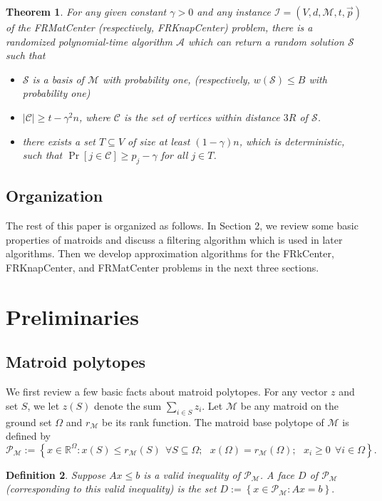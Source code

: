 \documentclass[a4paper,11pt]{article}
\newtheorem{theorem}{Theorem}[section]
\newtheorem{definition}[theorem]{Definition}
\newcommand{\A}{\mathcal{A}}
\newcommand{\C}{\mathcal{C}}
\renewcommand{\S}{\mathcal{S}}
\newcommand{\I}{\mathcal{I}}
\newcommand{\M}{\mathcal{M}}
\renewcommand{\P}{\mathcal{P}}
\begin{document}
\begin{theorem}
For any given constant $\gamma > 0$ and any instance $\I = (V, d, \M, t, \vec{p})$ of the \textsf{FRMatCenter} (respectively, \textsf{FRKnapCenter}) problem, there is a randomized polynomial-time algorithm $\A$ which can return a random solution $\S$ such that 
\begin{itemize}
	\item $\S$ is a basis of $\M$ with probability one, (respectively, $w(\S) \leq B$ with probability one)
	\item $|\C| \geq t - \gamma^2 n$, where $\C$ is the set of vertices within distance $3R$ of $\S$.
	\item there exists a set $T \subseteq V$ of size at least $(1 - \gamma)n$, which is deterministic, such that $\Pr[j \in \C] \geq p_j - \gamma$ for all $j \in T$.
\end{itemize} 
\label{thm:FRMatCenter}
\end{theorem}


\subsection{Organization}
The rest of this paper is organized as follows. In Section 2, we review some basic properties of matroids and discuss a filtering algorithm which is used in later algorithms. Then we develop approximation algorithms for the \textsf{FRkCenter}, \textsf{FRKnapCenter}, and \textsf{FRMatCenter} problems in the next three sections.




\section{Preliminaries}
\subsection{Matroid polytopes}
We first review a few basic facts about matroid polytopes. For any vector $z$ and set $S$, we let $z(S)$ denote the sum $\sum_{i \in S}z_i$. Let $\M$ be any matroid on the ground set $\Omega$ and $r_\M$ be its rank function. The matroid base polytope of $\M$ is defined by 
$$ \P_\M := \left\{x \in \mathbb{R}^{\Omega}: x(S) \leq r_\M(S) ~~ \forall S \subseteq \Omega; ~~~x(\Omega) = r_\M(\Omega);~~~ x_i \geq 0 ~~\forall i \in \Omega \right\}. $$

\begin{definition} Suppose $A x \leq b$ is a valid inequality of $\P_\M$. A face $D$ of $\P_\M$ (corresponding to this valid inequality) is the set $ D := \left\{x \in \P_\M: A x = b \right\}.	$
\end{definition}
\end{document}

